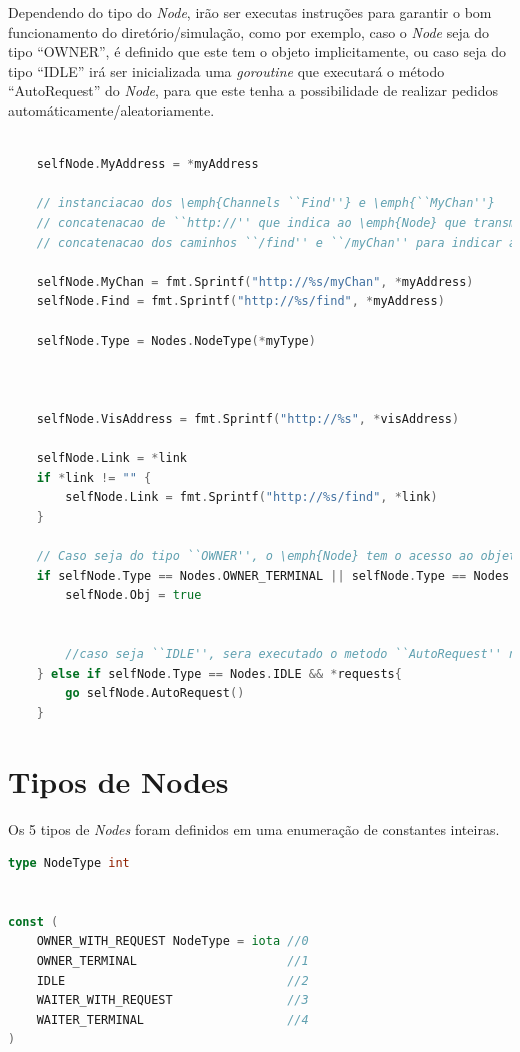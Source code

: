 Dependendo do tipo do \emph{Node}, irão ser executas instruções para garantir o bom funcionamento do diretório/simulação,
como por exemplo, caso o \emph{Node} seja do tipo ``OWNER'', é definido que este tem o objeto implicitamente, ou
caso seja do tipo ``IDLE'' irá ser inicializada uma \emph{goroutine} que executará o método ``AutoRequest'' do \emph{Node},
para que este tenha a possibilidade de realizar pedidos automáticamente/aleatoriamente.

\begin{lstlisting}[caption={Instanciação dos atributos do \emph{Node}.},language=Go]

	selfNode.MyAddress = *myAddress

	// instanciacao dos \emph{Channels ``Find''} e \emph{``MyChan''}
	// concatenacao de ``http://'' que indica ao \emph{Node} que transmitira o pedido que este deve ser um pedido \acs{HTTP}
	// concatenacao dos caminhos ``/find'' e ``/myChan'' para indicar aos \emph{Nodes} para que \emph{Channel} sera enviado

	selfNode.MyChan = fmt.Sprintf("http://%s/myChan", *myAddress)
	selfNode.Find = fmt.Sprintf("http://%s/find", *myAddress)

	selfNode.Type = Nodes.NodeType(*myType)



	selfNode.VisAddress = fmt.Sprintf("http://%s", *visAddress)

	selfNode.Link = *link
	if *link != "" {
		selfNode.Link = fmt.Sprintf("http://%s/find", *link)
	}

	// Caso seja do tipo ``OWNER'', o \emph{Node} tem o acesso ao objeto
	if selfNode.Type == Nodes.OWNER_TERMINAL || selfNode.Type == Nodes.OWNER_WITH_REQUEST {
		selfNode.Obj = true


		//caso seja ``IDLE'', sera executado o metodo ``AutoRequest'' numa nova \emph{Goroutine}
	} else if selfNode.Type == Nodes.IDLE && *requests{ 
		go selfNode.AutoRequest()
	}

\end{lstlisting}


\section{Tipos de Nodes}
\label{chap:imp:node:tipos}

Os 5 tipos de \emph{Nodes} foram definidos em uma enumeração de constantes inteiras.
\begin{lstlisting}[caption={Definição da enumeração dos tipos de \emph{Node}},language=Go]
type NodeType int


const (
	OWNER_WITH_REQUEST NodeType = iota //0
	OWNER_TERMINAL                     //1
	IDLE                               //2
	WAITER_WITH_REQUEST                //3
	WAITER_TERMINAL					   //4
)

\end{lstlisting}

